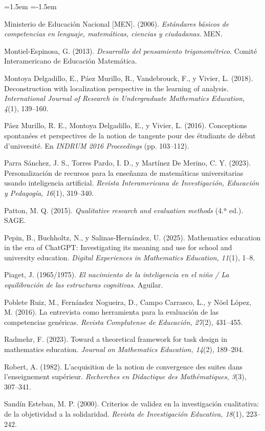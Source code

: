 \documentclass[11pt,letterpaper]{article}
\begin{document}
\begin{list}{}{\leftmargin=1.5em \itemindent=-1.5em \itemsep=3pt \parsep=0pt}
\item Ministerio de Educación Nacional [MEN]. (2006). \emph{Estándares básicos de competencias en lenguaje, matemáticas, ciencias y ciudadanas}. MEN.
\item Montiel-Espinosa, G. (2013). \emph{Desarrollo del pensamiento trigonométrico}. Comité Interamericano de Educación Matemática.
\item Montoya Delgadillo, E., Páez Murillo, R., Vandebrouck, F., y Vivier, L. (2018). Deconstruction with localization perspective in the learning of analysis. \emph{International Journal of Research in Undergraduate Mathematics Education, 4}(1), 139--160.
\item Páez Murillo, R. E., Montoya Delgadillo, E., y Vivier, L. (2016). Conceptions spontanées et perspectives de la notion de tangente pour des étudiants de début d'université. En \emph{INDRUM 2016 Proceedings} (pp. 103--112).
\item Parra Sánchez, J. S., Torres Pardo, I. D., y Martínez De Merino, C. Y. (2023). Personalización de recursos para la enseñanza de matemáticas universitarias usando inteligencia artificial. \emph{Revista Interamericana de Investigación, Educación y Pedagogía, 16}(1), 319--340.
\item Patton, M. Q. (2015). \emph{Qualitative research and evaluation methods} (4.ª ed.). SAGE.
\item Pepin, B., Buchholtz, N., y Salinas-Hernández, U. (2025). Mathematics education in the era of ChatGPT: Investigating its meaning and use for school and university education. \emph{Digital Experiences in Mathematics Education, 11}(1), 1--8.
\item Piaget, J. (1965/1975). \emph{El nacimiento de la inteligencia en el niño / La equilibración de las estructuras cognitivas}. Aguilar.
\item Poblete Ruiz, M., Fernández Nogueira, D., Campo Carrasco, L., y Nöel López, M. (2016). La entrevista como herramienta para la evaluación de las competencias genéricas. \emph{Revista Complutense de Educación, 27}(2), 431--455.
\item Radmehr, F. (2023). Toward a theoretical framework for task design in mathematics education. \emph{Journal on Mathematics Education, 14}(2), 189--204.
\item Robert, A. (1982). L'acquisition de la notion de convergence des suites dans l'enseignement supérieur. \emph{Recherches en Didactique des Mathématiques, 3}(3), 307--341.
\item Sandín Esteban, M. P. (2000). Criterios de validez en la investigación cualitativa: de la objetividad a la solidaridad. \emph{Revista de Investigación Educativa, 18}(1), 223--242.

\end{list}
\end{document}
